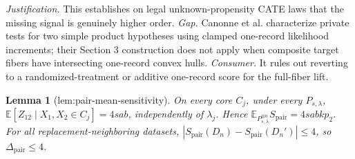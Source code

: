 \documentclass{article}
\newtheorem{lemma}{Lemma}
\begin{document}
\par\smallskip\noindent \textit{Justification.} This establishes on legal unknown-propensity CATE laws that the missing signal is genuinely higher order. \textit{Gap.} Canonne et al. characterize private tests for two simple product hypotheses using clamped one-record likelihood increments; their Section 3 construction does not apply when composite target fibers have intersecting one-record convex hulls. \textit{Consumer.} It rules out reverting to a randomized-treatment or additive one-record score for the full-fiber lift.

\begin{lemma}[lem:pair-mean-sensitivity]\label{lem:pair-mean-sensitivity}
On every core \(C_j\), under every \(P_{s,\lambda}\), \(\mathbb E[Z_{12}\mid X_1,X_2\in C_j]=4sab\), independently of \(\lambda_j\). Hence \(\mathbb E_{P_{s,\lambda}^{\otimes n}}S_{\mathrm{pair}}=4sabkp_2\). For all replacement-neighboring datasets, \(|S_{\mathrm{pair}}(D_n)-S_{\mathrm{pair}}(D_n')|\le4\), so \(\Delta_{\mathrm{pair}}\le4\).
\end{lemma}
\end{document}
